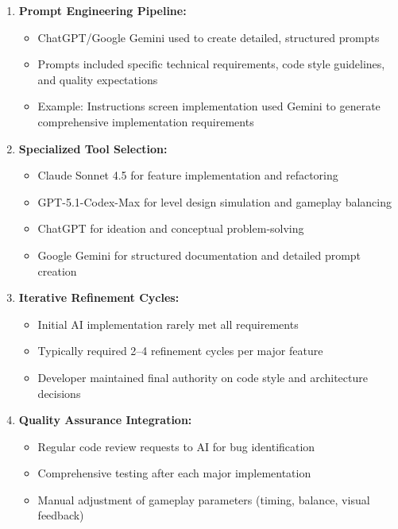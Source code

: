 \documentclass[12pt,a4paper]{article}
\begin{document}
\begin{enumerate}
    \item \textbf{Prompt Engineering Pipeline:}
    \begin{itemize}
        \item ChatGPT/Google Gemini used to create detailed, structured prompts
        \item Prompts included specific technical requirements, code style guidelines, and quality expectations
        \item Example: Instructions screen implementation used Gemini to generate comprehensive implementation requirements
    \end{itemize}
    
    \item \textbf{Specialized Tool Selection:}
    \begin{itemize}
        \item Claude Sonnet 4.5 for feature implementation and refactoring
        \item GPT-5.1-Codex-Max for level design simulation and gameplay balancing
        \item ChatGPT for ideation and conceptual problem-solving
        \item Google Gemini for structured documentation and detailed prompt creation
    \end{itemize}
    
    \item \textbf{Iterative Refinement Cycles:}
    \begin{itemize}
        \item Initial AI implementation rarely met all requirements
        \item Typically required 2--4 refinement cycles per major feature
        \item Developer maintained final authority on code style and architecture decisions
    \end{itemize}
    
    \item \textbf{Quality Assurance Integration:}
    \begin{itemize}
        \item Regular code review requests to AI for bug identification
        \item Comprehensive testing after each major implementation
        \item Manual adjustment of gameplay parameters (timing, balance, visual feedback)
    \end{itemize}
\end{enumerate}
\end{document}
